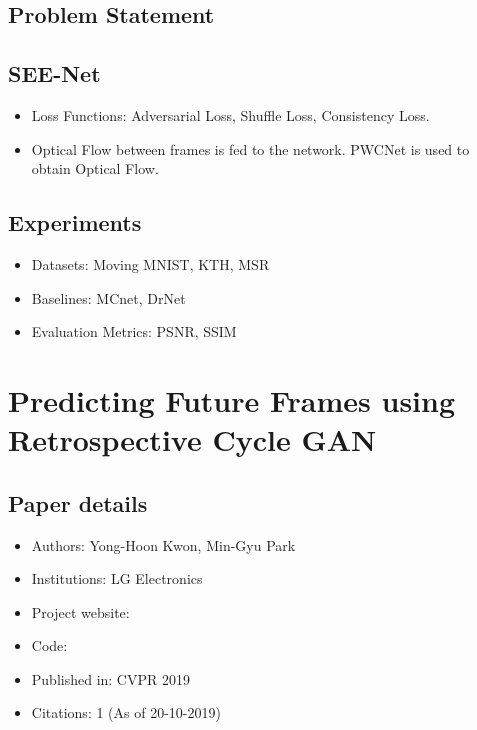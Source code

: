 \documentclass{article}
\begin{document}
    \subsection{Problem Statement}\label{subsec:Order_Matters_Shuffling_Sequence_Generation_for_Video_Prediction_(SEE_Net):problem-statement}

    \subsection{SEE-Net}\label{subsec:Order_Matters_Shuffling_Sequence_Generation_for_Video_Prediction_(SEE_Net):see-net}
    \begin{itemize}
        \item Loss Functions: Adversarial Loss, Shuffle Loss, Consistency Loss.
        \item Optical Flow between frames is fed to the network.
        PWCNet is used to obtain Optical Flow.
    \end{itemize}

    \subsection{Experiments}\label{subsec:Order_Matters_Shuffling_Sequence_Generation_for_Video_Prediction_(SEE_Net):experiments}
    \begin{itemize}
        \item Datasets: Moving MNIST, KTH, MSR
        \item Baselines: MCnet, DrNet
        \item Evaluation Metrics: PSNR, SSIM
    \end{itemize}
    \newpage


    \section{Predicting Future Frames using Retrospective Cycle GAN}\label{sec:Predicting_Future_Frames_using_Retrospective_Cycle_GAN}
    \subsection*{Paper details}
    \begin{itemize}
        \item Authors: Yong-Hoon Kwon, Min-Gyu Park
        \item Institutions: LG Electronics
        \item Project website:
        \item Code:
        \item Published in: CVPR 2019
        \item Citations: 1 (As of 20-10-2019)
    \end{itemize}
\end{document}

